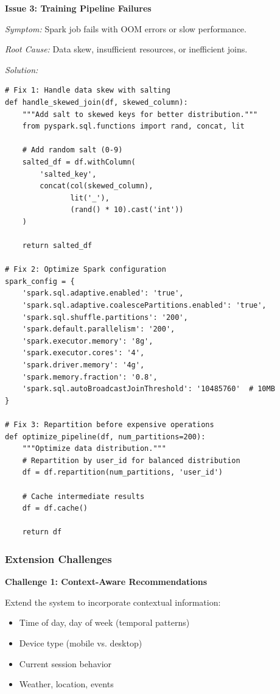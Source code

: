 \textbf{Issue 3: Training Pipeline Failures}

\textit{Symptom:} Spark job fails with OOM errors or slow performance.

\textit{Root Cause:} Data skew, insufficient resources, or inefficient joins.

\textit{Solution:}
\begin{lstlisting}[style=python]
# Fix 1: Handle data skew with salting
def handle_skewed_join(df, skewed_column):
    """Add salt to skewed keys for better distribution."""
    from pyspark.sql.functions import rand, concat, lit

    # Add random salt (0-9)
    salted_df = df.withColumn(
        'salted_key',
        concat(col(skewed_column),
               lit('_'),
               (rand() * 10).cast('int'))
    )

    return salted_df

# Fix 2: Optimize Spark configuration
spark_config = {
    'spark.sql.adaptive.enabled': 'true',
    'spark.sql.adaptive.coalescePartitions.enabled': 'true',
    'spark.sql.shuffle.partitions': '200',
    'spark.default.parallelism': '200',
    'spark.executor.memory': '8g',
    'spark.executor.cores': '4',
    'spark.driver.memory': '4g',
    'spark.memory.fraction': '0.8',
    'spark.sql.autoBroadcastJoinThreshold': '10485760'  # 10MB
}

# Fix 3: Repartition before expensive operations
def optimize_pipeline(df, num_partitions=200):
    """Optimize data distribution."""
    # Repartition by user_id for balanced distribution
    df = df.repartition(num_partitions, 'user_id')

    # Cache intermediate results
    df = df.cache()

    return df
\end{lstlisting}

\subsubsection*{Extension Challenges}

\textbf{Challenge 1: Context-Aware Recommendations}

Extend the system to incorporate contextual information:
\begin{itemize}
    \item Time of day, day of week (temporal patterns)
    \item Device type (mobile vs. desktop)
    \item Current session behavior
    \item Weather, location, events
\end{itemize}

